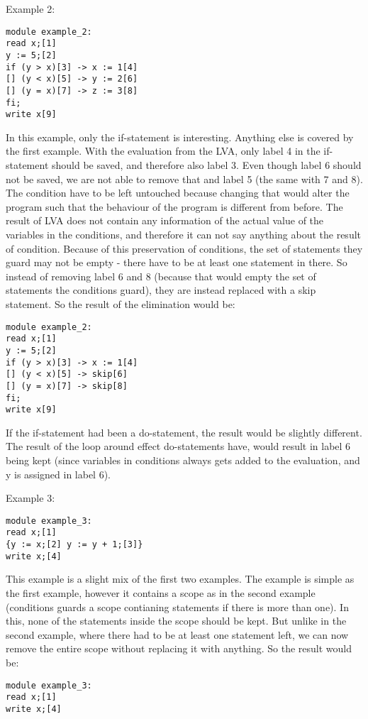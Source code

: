 \docpar
Example 2:
\begin{lstlisting}
module example_2:
read x;[1]
y := 5;[2]
if (y > x)[3] -> x := 1[4]
[] (y < x)[5] -> y := 2[6]
[] (y = x)[7] -> z := 3[8]
fi;
write x[9]
\end{lstlisting}
In this example, only the if-statement is interesting. Anything else is covered by the first example. With the evaluation from the LVA, only label 4 in the if-statement should be saved, and therefore also label 3.
Even though label 6 should not be saved, we are not able to remove that and label 5 (the same with 7 and 8). The condition have to be left untouched because changing that would alter the program such that the behaviour of the program is different from before. The result of LVA does not contain any information of the actual value of the variables in the conditions, and therefore it can not say anything about the result of condition. Because of this preservation of conditions, the set of statements they guard may not be empty - there have to be at least one statement in there. So instead of removing label 6 and 8 (because that would empty the set of statements the conditions guard), they are instead replaced with a skip statement. So the result of the elimination would be:
\begin{lstlisting}
module example_2:
read x;[1]
y := 5;[2]
if (y > x)[3] -> x := 1[4]
[] (y < x)[5] -> skip[6]
[] (y = x)[7] -> skip[8]
fi;
write x[9]
\end{lstlisting}
If the if-statement had been a do-statement, the result would be slightly different. The result of the loop around effect do-statements have, would result in label 6 being kept (since variables in conditions always gets added to the evaluation, and y is assigned in label 6).

\docpar
Example 3:
\begin{lstlisting}
module example_3:
read x;[1]
{y := x;[2] y := y + 1;[3]}
write x;[4]
\end{lstlisting}
This example is a slight mix of the first two examples. The example is simple as the first example, however it contains a scope as in the second example (conditions guards a scope contianing statements if there is more than one). In this, none of the statements inside the scope should be kept. But unlike in the second example, where there had to be at least one statement left, we can now remove the entire scope without replacing it with anything. So the result would be:
\begin{lstlisting}
module example_3:
read x;[1]
write x;[4]
\end{lstlisting}

